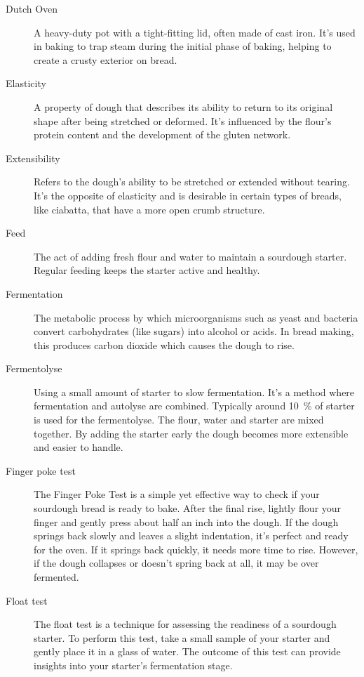\begin{description}
\item[Dutch Oven] A heavy-duty pot with a tight-fitting lid, often made of cast
iron. It's used in baking to trap steam during the initial phase of baking, helping
to create a crusty exterior on bread.

\item[Elasticity] A property of dough that describes its ability to return to
its original shape after being stretched or deformed. It's influenced by the flour's
protein content and the development of the gluten network.

\item[Extensibility] Refers to the dough’s ability to be stretched or extended
without tearing. It's the opposite of elasticity and is desirable in certain types
of breads, like ciabatta, that have a more open crumb structure.

\item[Feed] The act of adding fresh flour and water to maintain a sourdough
starter. Regular feeding keeps the starter active and healthy.

\item[Fermentation] The metabolic process by which microorganisms such as yeast
and bacteria convert carbohydrates (like sugars) into alcohol or acids. In bread
making, this produces carbon dioxide which causes the dough to rise.

\item[Fermentolyse] Using a small amount of starter to slow fermentation.
It's a method where fermentation and autolyse are combined. Typically around \SI{10}{\percent}
of starter is used for the fermentolyse. The flour, water and starter are mixed
together. By adding the starter early the dough becomes more extensible and easier
to handle.

\item[Finger poke test] The Finger Poke Test is a simple yet effective way to
check if your sourdough bread is ready to bake. After the final rise, lightly
flour your finger and gently press about half an inch into the dough.
If the dough springs back slowly and leaves a slight indentation, it's perfect
and ready for the oven. If it springs back quickly, it needs more time to rise.
However, if the dough collapses or doesn't spring back at all, it may be
over fermented.

\item[Float test] The float test is a technique for assessing the readiness
of a sourdough starter. To perform this test, take a small sample of
your starter and gently place it in a glass of water. The outcome
of this test can provide insights into your starter's fermentation stage.


\end{description}
